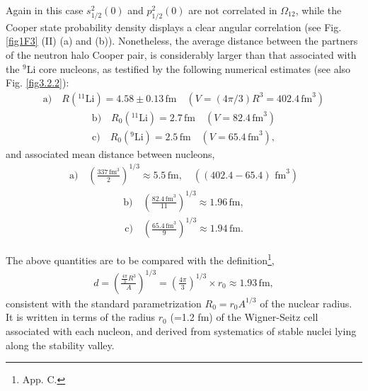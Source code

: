  Again in this case $s_{1/2}^2(0)$ and $p_{1/2}^2(0)$ are not correlated in $\Omega_{12}$, while the Cooper state probability density displays a clear angular correlation (see Fig. \ref{fig1F3} (II) (a) and (b)). Nonetheless, the average distance between the partners of the neutron halo Cooper pair, is considerably larger than that associated with the $^9$Li core nucleons, as testified by the following numerical estimates (see also Fig. \ref{fig3.2.2}):
\begin{align}\label{eq3.2.21}
 \text{a)}\quad R(^{11}\text{Li})= 4.58\pm 0.13 \,\text{fm}\quad (V=\left(4\pi/3\right)R^3=402.4 \,\text{fm}^3)
\end{align}
\begin{align}
 \text{b)}\quad R_0 (^{11}\text{Li})=2.7\,\text{fm}\quad (V=82.4\,\text{fm}^3)
\end{align}
\begin{align}
 \text{c)}\quad R_0 (^{9}\text{Li})=2.5\,\text{fm}\quad (V=65.4\,\text{fm}^3),
\end{align}
and associated mean distance between nucleons, 
\begin{align}\label{eq3.2.24}
 \text{a)}\quad \left(\frac{337\,\text{fm}^3}{2}\right)^{1/3}\approx 5.5\,\text{fm},\quad((402.4-65.4)\text{ fm}^3)
\end{align}
\begin{align}
 \text{b)}\quad \left(\frac{82.4\,\text{fm}^3}{11}\right)^{1/3}\approx 1.96\,\text{fm},
\end{align}
\begin{align}\label{eq4.3.9}
 \text{c)}\quad \left(\frac{65.4\,\text{fm}^3}{9}\right)^{1/3}\approx 1.94\,\text{fm}.
\end{align}



The above quantities are to be compared with the definition\footnote{\cite{Brink:05} App. C.},
\begin{align}\label{eq3.2.27}
d=\left(\frac{\frac{4\pi}{3}R^3}{A}\right)^{1/3}=\left(\frac{4\pi}{3}\right)^{1/3}\times r_0\approx 1.93\, \text{fm},
\end{align} 
consistent with the standard parametrization $R_0=r_0A^{1/3}$ of the nuclear radius. It is written in terms of the  radius $r_0$ (=1.2 fm) of the Wigner-Seitz cell associated with each nucleon, and derived from systematics of stable nuclei lying along the stability valley.
